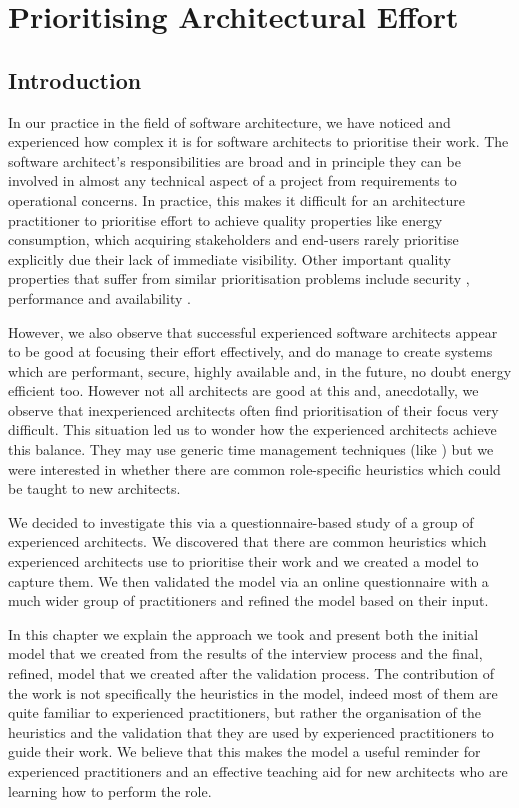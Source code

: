 \chapter{Prioritising Architectural Effort}

\section{Introduction}

In our practice in the field of software architecture, we have noticed and experienced how complex it is for software architects to prioritise their work.  The software architect's responsibilities are broad and in principle they can be involved in almost any technical aspect of a project from requirements to operational concerns.  In practice, this makes it difficult for an architecture practitioner to prioritise effort to achieve quality properties like energy consumption, which acquiring stakeholders and end-users rarely prioritise explicitly due their lack of immediate visibility.  Other important quality properties that suffer from similar prioritisation problems include security \cite{cisco2016-uksecprioritisation}, performance and availability \cite{ozkaya2008-qualityproperties}. 

However, we also observe that successful experienced software architects appear to be good at focusing their effort effectively, and do manage to create systems which are performant, secure, highly available and, in the future, no doubt energy efficient too. However not all architects are good at this and, anecdotally, we observe that inexperienced architects often find prioritisation of their focus very difficult.  This situation led us to wonder how the experienced architects achieve this balance.  They may use generic time management techniques (like \cite{allen2015-gettingthingsdone}) but we were interested in whether there are common role-specific heuristics which could be taught to new architects.

We decided to investigate this via a questionnaire-based study of a group of experienced architects.  We discovered that there are common heuristics which experienced architects use to prioritise their work and we created a model to capture them.  We then validated the model via an online questionnaire with a much wider group of practitioners and refined the model based on their input.

In this chapter we explain the approach we took and present both the initial model that we created from the results of the interview process and the final, refined, model that we created after the validation process.  The contribution of the work is not specifically the heuristics in the model, indeed most of them are quite familiar to experienced practitioners, but rather the organisation of the heuristics and the validation that they are used by experienced practitioners to guide their work.  We believe that this makes the model a useful reminder for experienced practitioners and an effective teaching aid for new architects who are learning how to perform the role.

